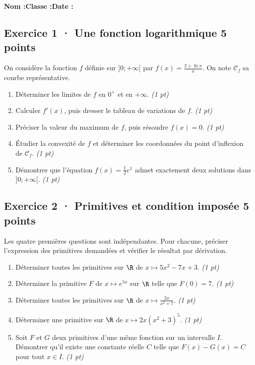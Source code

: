 \smallskip\textbf{Nom :}\enspace\dotfill\quad\textbf{Classe :}\enspace\dotfill\quad\textbf{Date :}\enspace\dotfill

\subsection*{Exercice 1 · Une fonction logarithmique \hfill 5 points}On considère la fonction $f$ définie sur $]0;+\infty[$ par $f(x)=\frac{2+\ln x}x$. On note $\mathcal C_f$ sa courbe représentative.

\begin{enumerate}

\item Déterminer les limites de $f$ en $0^+$ et en $+\infty$. \hfill\textit{(1 pt)}

\item Calculer $f' (x)$, puis dresser le tableau de variations de $f$. \hfill\textit{(1 pt)}

\item Préciser la valeur du maximum de $f$, puis résoudre $f(x)=0$. \hfill\textit{(1 pt)}

\item Étudier la convexité de $f$ et déterminer les coordonnées du point d'inflexion de $\mathcal C_f$. \hfill\textit{(1 pt)}

\item Démontrer que l'équation $f(x)=\frac12 e^{1}$ admet exactement deux solutions dans $]0;+\infty[$. \hfill\textit{(1 pt)}

\end{enumerate}

\subsection*{Exercice 2 · Primitives et condition imposée \hfill 5 points}Les quatre premières questions sont indépendantes. Pour chacune, préciser l'expression des primitives demandées et vérifier le résultat par dérivation.

\begin{enumerate}

\item Déterminer toutes les primitives sur $\R$ de $x\mapsto 5x^2-7x+3$. \hfill\textit{(1 pt)}

\item Déterminer la primitive $F$ de $x\mapsto e^{5x}$ sur $\R$ telle que $F(0)=7$. \hfill\textit{(1 pt)}

\item Déterminer toutes les primitives sur $\R$ de $x\mapsto\frac{2x}{x^2+7}$. \hfill\textit{(1 pt)}

\item Déterminer une primitive sur $\R$ de $x\mapsto2x(x^2+3)^{5}$. \hfill\textit{(1 pt)}

\item Soit $F$ et $G$ deux primitives d'une même fonction sur un intervalle $I$. Démontrer qu'il existe une constante réelle $C$ telle que $F(x)-G(x)=C$ pour tout $x\in I$. \hfill\textit{(1 pt)}

\end{enumerate}

